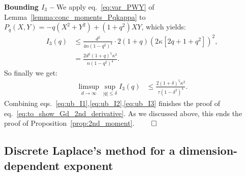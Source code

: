 \myskip 
\textbf{Bounding $I_3$ --}
We apply eq.~\eqref{eq:var_PWY} of Lemma~\ref{lemma:conc_moments_Pqkappa} to $P_q(X, Y) = - q (X^2+Y^2) + (1+q^2) XY$, which yields:
\begin{align*}
    I_3(q) &\leq \frac{d^2}{4 n (1-q^2)^4} \cdot 2(1+q) \left(2 \kappa [2 q + 1+q^2]\right)^2, \\ 
    &= \frac{2d^2 (1+q)^5 \kappa^2}{n (1-q^2)^4}.
\end{align*}
So finally we get:
\begin{align}\label{eq:ub_I3}
    \limsup_{d \to \infty} \sup_{|q| \leq \delta} I_3(q) &\leq \frac{2(1+\delta)^5 \kappa^2}{\tau (1-\delta^2)^4}.
\end{align}
Combining eqs.~\eqref{eq:ub_I1},\eqref{eq:ub_I2},\eqref{eq:ub_I3} finishes the proof of eq.~\eqref{eq:to_show_Gd_2nd_derivative}. 
As we discussed above, this ends the proof of Proposition~\ref{prop:2nd_moment}.
$\qed$

\subsection{Discrete Laplace's method for a dimension-dependent exponent}\label{subsec:proof_laplace_discrete}

